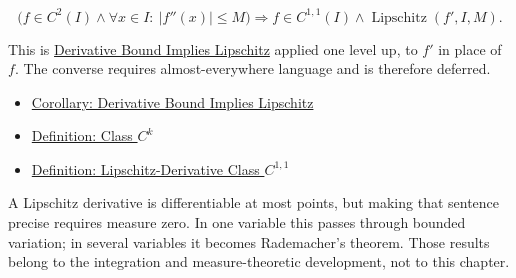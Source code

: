 \begin{remark*}
\[
  \bigl(f\in C^2(I)\land \forall x\in I:\ |f''(x)|\leq M\bigr)
  \Rightarrow
  f\in C^{1,1}(I)\land \operatorname{Lipschitz}(f',I,M).
\]
\end{remark*}

\begin{remark*}[Interpretation]
This is \hyperref[cor:derivative-bound-implies-lipschitz]{Derivative Bound
Implies Lipschitz} applied one level up, to \(f'\) in place of \(f\). The
converse requires almost-everywhere language and is therefore deferred.
\end{remark*}

\begin{dependencies}
\begin{itemize}
  \item \hyperref[cor:derivative-bound-implies-lipschitz]{Corollary: Derivative Bound Implies Lipschitz}
  \item \hyperref[def:class-ck]{Definition: Class \(C^k\)}
  \item \hyperref[def:class-c11]{Definition: Lipschitz-Derivative Class \(C^{1,1}\)}
\end{itemize}
\end{dependencies}

\begin{remark*}
A Lipschitz derivative is differentiable at most points, but making that
sentence precise requires measure zero. In one variable this passes through
bounded variation; in several variables it becomes Rademacher's theorem.
Those results belong to the integration and measure-theoretic development,
not to this chapter.
\end{remark*}

